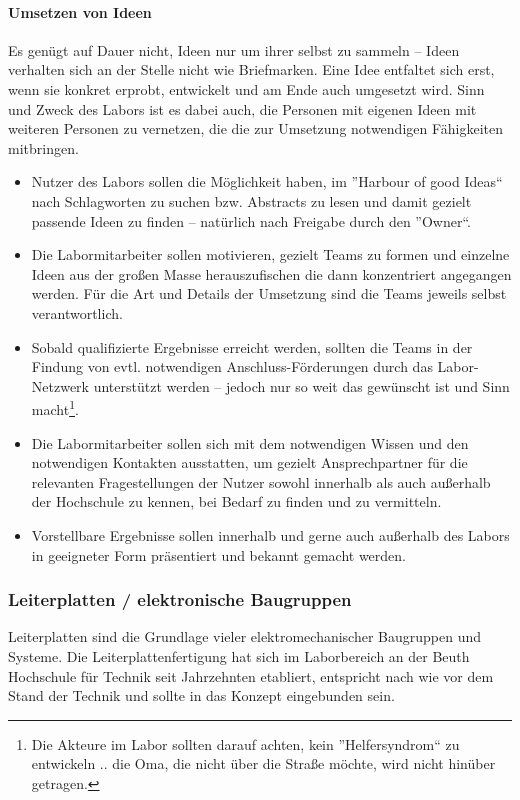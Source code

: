 \documentclass[parskip=half,headsepline,footsepline,titlepage]{scrartcl}
\begin{document}
\paragraph{Umsetzen von Ideen}
Es genügt auf Dauer nicht, Ideen nur um ihrer selbst zu sammeln -- Ideen verhalten sich an der Stelle nicht wie Briefmarken. Eine Idee entfaltet sich erst, wenn sie konkret erprobt, entwickelt und am Ende auch umgesetzt wird.
Sinn und Zweck des Labors ist es dabei auch, die Personen mit eigenen Ideen mit weiteren Personen zu vernetzen, die die zur Umsetzung notwendigen Fähigkeiten mitbringen.

\begin{itemize}
\item Nutzer des Labors sollen die Möglichkeit haben, im ''Harbour of good Ideas`` nach Schlagworten zu suchen bzw. Abstracts zu lesen und damit gezielt passende Ideen zu finden -- natürlich nach Freigabe durch den ''Owner``.
\item Die Labormitarbeiter sollen motivieren, gezielt Teams zu formen und einzelne Ideen aus der großen Masse herauszufischen die dann konzentriert angegangen werden. Für die Art und Details der Umsetzung sind die Teams jeweils selbst verantwortlich.
\item Sobald qualifizierte Ergebnisse erreicht werden, sollten die Teams in der Findung von evtl. notwendigen Anschluss-Förderungen durch das Labor-Netzwerk unterstützt werden -- jedoch nur so weit das gewünscht ist und Sinn macht\footnote{Die Akteure im Labor sollten darauf achten, kein ''Helfersyndrom`` zu entwickeln .. die Oma, die nicht über die Straße möchte, wird nicht hinüber getragen.}.
\item Die Labormitarbeiter sollen sich mit dem notwendigen Wissen und den notwendigen Kontakten ausstatten, um gezielt Ansprechpartner für die relevanten Fragestellungen der Nutzer sowohl innerhalb als auch außerhalb der Hochschule zu kennen, bei Bedarf zu finden und zu vermitteln.
\item Vorstellbare Ergebnisse sollen innerhalb und gerne auch außerhalb des Labors in geeigneter Form präsentiert und bekannt gemacht werden. 
\end{itemize}


\subsubsection{Leiterplatten / elektronische Baugruppen}
Leiterplatten sind die Grundlage vieler elektromechanischer Baugruppen und Systeme. Die Leiterplattenfertigung hat sich im Laborbereich an der Beuth Hochschule für Technik seit Jahrzehnten etabliert, entspricht nach wie vor dem Stand der Technik und sollte in das Konzept eingebunden sein.
\end{document}
